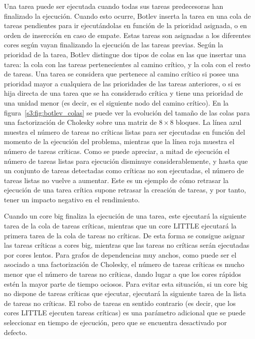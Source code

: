 Una tarea puede ser ejecutada cuando todas sus tareas predecesoras han
finalizado la ejecución. Cuando esto ocurre, Botlev inserta la tarea en una
cola de tareas pendientes para ir ejecutándolas en función de la prioridad
asignada, o en orden de insercción en caso de empate. Estas tareas son
asignadas a los diferentes cores según vayan finalizando la ejecución de
las tareas previas. Según la prioridad de la tarea, Botlev distingue dos
tipos de colas en las que insertar una tarea: la cola con las tareas
pertenecientes al camino crítico, y la cola con el resto de tareas. Una
tarea se considera que pertenece al camino crítico si posee una prioridad
mayor a cualquiera de las prioridades de las tareas anteriores, o si es
hija directa de una tarea que se ha considerado crítica y tiene una
prioridad de una unidad menor (es decir, es el siguiente nodo del camino
crítico). En la figura~\ref{s3:fig:botlev_colas} se puede ver la evolución
del tamaño de las colas para una factorización de Cholesky sobre una matriz
de $8\times8$ bloques. La línea azul muestra el número de tareas no
críticas listas para ser ejecutadas en función del momento de la ejecución
del problema, mientras que la línea roja muestra el número de tareas
críticas. Como se puede apreciar, a mitad de ejecución el número de tareas
listas para ejecución disminuye considerablemente, y hasta que un conjunto
de tareas detectadas como críticas no son ejecutadas, el número de tareas
listas no vuelve a aumentar. Este es un ejemplo de cómo retrasar la
ejecución de una tarea crítica supone retrasar la creación de tareas, y por
tanto, tener un impacto negativo en el rendimiento.

Cuando un core big finaliza la ejecución de una tarea, este ejecutará la
siguiente tarea de la cola de tareas críticas, mientras que un core LITTLE
ejecutará la primera tarea de la cola de tareas no críticas. De esta forma
se consigue asignar las tareas críticas a cores big, mientras que las
tareas no críticas serán ejecutadas por cores lentos. Para grafos de
dependencias muy anchos, como puede ser el asociado a una factorización de
Cholesky, el número de tareas críticas es mucho menor que el número de
tareas no críticas, dando lugar a que los cores rápidos estén la mayor
parte de tiempo ociosos. Para evitar esta situación, si un core big no
dispone de tareas críticas que ejecutar, ejecutará la siguiente tarea de la
lista de tareas no críticas. El robo de tareas en sentido contrario (es
decir, que los cores LITTLE ejecuten tareas críticas) es una parámetro
adicional que se puede seleccionar en tiempo de ejecución, pero que se
encuentra desactivado por defecto.




